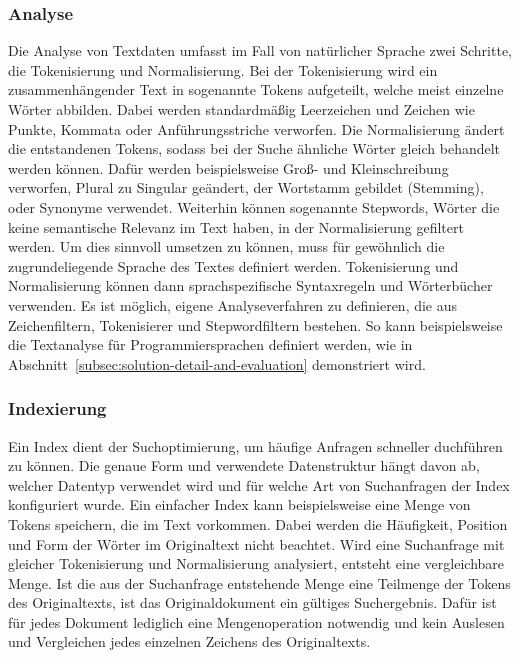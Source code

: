 \subsubsection{Analyse}
Die Analyse von Textdaten umfasst im Fall von natürlicher Sprache zwei Schritte, die Tokenisierung und Normalisierung.
Bei der Tokenisierung wird ein zusammenhängender Text in sogenannte Tokens aufgeteilt, welche meist einzelne Wörter abbilden.
Dabei werden standardmäßig Leerzeichen und Zeichen wie Punkte, Kommata oder Anführungsstriche verworfen.
Die Normalisierung ändert die entstandenen Tokens, sodass bei der Suche ähnliche Wörter gleich behandelt werden können.
Dafür werden beispielsweise Groß- und Kleinschreibung verworfen, Plural zu Singular geändert, der Wortstamm gebildet (Stemming), oder Synonyme verwendet.
Weiterhin können sogenannte Stepwords, Wörter die keine semantische Relevanz im Text haben, in der Normalisierung gefiltert werden.
Um dies sinnvoll umsetzen zu können, muss für gewöhnlich die zugrundeliegende Sprache des Textes definiert werden.
Tokenisierung und Normalisierung können dann sprachspezifische Syntaxregeln und Wörterbücher verwenden.\cite{elastic-analysis-overview}
Es ist möglich, eigene Analyseverfahren zu definieren, die aus Zeichenfiltern, Tokenisierer und Stepwordfiltern bestehen.\cite{elastic-custom-analyser}
So kann beispielsweise die Textanalyse für Programmiersprachen definiert werden, wie in Abschnitt~\ref{subsec:solution-detail-and-evaluation} demonstriert wird.

\subsubsection{Indexierung}
Ein Index dient der Suchoptimierung, um häufige Anfragen schneller duchführen zu können.
Die genaue Form und verwendete Datenstruktur hängt davon ab, welcher Datentyp verwendet wird und für welche Art von Suchanfragen der Index konfiguriert wurde.
Ein einfacher Index kann beispielsweise eine Menge von Tokens speichern, die im Text vorkommen.
Dabei werden die Häufigkeit, Position und Form der Wörter im Originaltext nicht beachtet.
Wird eine Suchanfrage mit gleicher Tokenisierung und Normalisierung analysiert, entsteht eine vergleichbare Menge.
Ist die aus der Suchanfrage entstehende Menge eine Teilmenge der Tokens des Originaltexts, ist das Originaldokument ein gültiges Suchergebnis.
Dafür ist für jedes Dokument lediglich eine Mengenoperation notwendig und kein Auslesen und Vergleichen jedes einzelnen Zeichens des Originaltexts.\cite{elastic-index-search-time}

